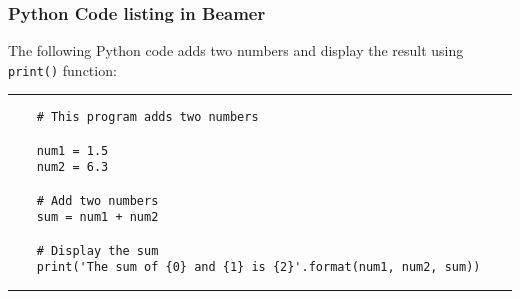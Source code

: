 \documentclass{beamer}
\begin{document}
\begin{frame}[fragile]
\frametitle{Python Code listing in Beamer}

The following Python code adds two numbers and display the result using \verb|print()| function:


\rule{\textwidth}{1pt}

\scriptsize
\begin{verbatim}
    # This program adds two numbers

    num1 = 1.5
    num2 = 6.3

    # Add two numbers
    sum = num1 + num2

    # Display the sum
    print('The sum of {0} and {1} is {2}'.format(num1, num2, sum))
\end{verbatim}

\rule{\textwidth}{1pt}

\end{frame}
\end{document}
